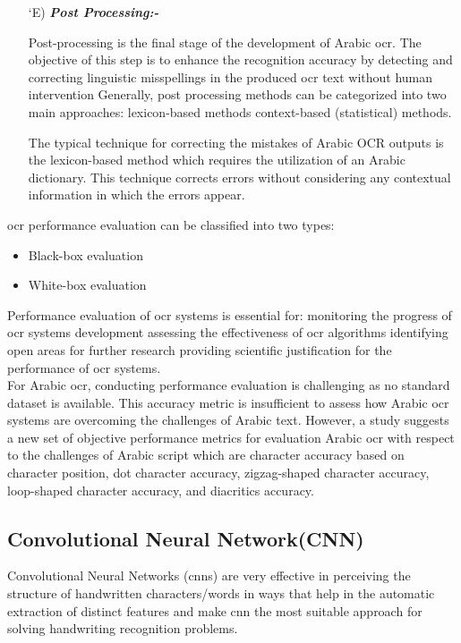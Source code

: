 \begin{itemize}[labelindent=1em,labelsep=0.25cm,leftmargin=*]
        \item[\char `E)] \textit{\textbf{Post Processing:-}}
        
        Post-processing is the final stage of the development of Arabic \acrshort{ocr}. The objective of this step is to enhance the recognition accuracy by detecting and correcting linguistic misspellings in the produced \acrshort{ocr} text without human intervention Generally, post processing methods can be categorized into two main approaches: lexicon-based methods context-based (statistical) methods.

        The typical technique for correcting the mistakes of Arabic OCR outputs is the lexicon-based method which requires the utilization of an Arabic dictionary. This technique corrects errors without considering any contextual information in which the errors appear.

        \end{itemize}
        \acrshort{ocr} performance evaluation can be classified into two types:
        \begin{itemize}[itemsep=1pt, topsep=5pt]
            \item Black-box evaluation  
            \item White-box evaluation
        \end{itemize} 

        Performance evaluation of \acrshort{ocr} systems is essential for: monitoring the progress of \acrshort{ocr} systems development assessing the effectiveness of \acrshort{ocr} algorithms identifying open areas for further research providing scientific justification for the performance of \acrshort{ocr} systems.\\

For Arabic \acrshort{ocr}, conducting performance evaluation is challenging as no standard dataset is available. This accuracy metric is insufficient to assess how Arabic \acrshort{ocr} systems are overcoming the challenges of Arabic text. However, a study suggests a new set of objective performance metrics for evaluation Arabic \acrshort{ocr} with respect to the challenges of Arabic script which are character accuracy based on character position, dot character accuracy, zigzag-shaped character accuracy, loop-shaped character accuracy, and diacritics accuracy.

\subsection{Convolutional Neural Network(CNN)}
Convolutional Neural Networks (\acrshort{cnn}s) are very effective in perceiving the structure of handwritten characters/words in ways that help in the automatic extraction of distinct features and make \acrshort{cnn} the most suitable approach for solving handwriting recognition problems.\\

